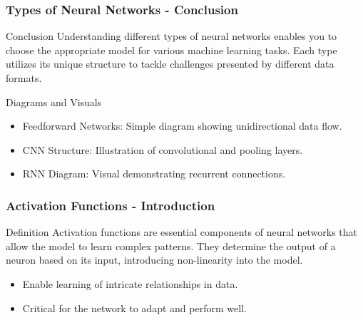 \documentclass[aspectratio=169]{beamer}
\begin{document}
\begin{frame}[fragile]
    \frametitle{Types of Neural Networks - Conclusion}
    \begin{block}{Conclusion}
        Understanding different types of neural networks enables you to choose the appropriate model for various machine learning tasks. Each type utilizes its unique structure to tackle challenges presented by different data formats.
    \end{block}
    \begin{block}{Diagrams and Visuals}
        \begin{itemize}
            \item Feedforward Networks: Simple diagram showing unidirectional data flow.
            \item CNN Structure: Illustration of convolutional and pooling layers.
            \item RNN Diagram: Visual demonstrating recurrent connections.
        \end{itemize}
    \end{block}
\end{frame}

\begin{frame}[fragile]
    \frametitle{Activation Functions - Introduction}
    \begin{block}{Definition}
        Activation functions are essential components of neural networks that allow the model to learn complex patterns. 
        They determine the output of a neuron based on its input, introducing non-linearity into the model.
    \end{block}
    \begin{itemize}
        \item Enable learning of intricate relationships in data.
        \item Critical for the network to adapt and perform well.
    \end{itemize}
\end{frame}
\end{document}
